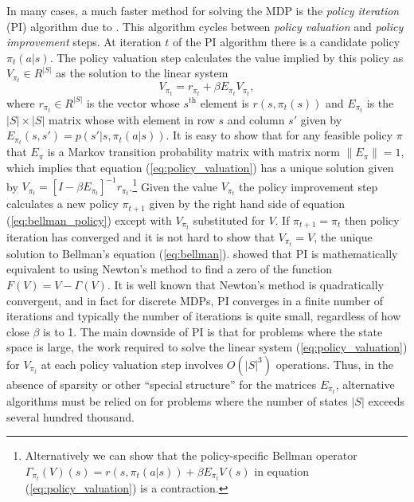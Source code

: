 In many cases, a much faster method for solving the MDP is the {\it policy iteration\/} (PI) algorithm due to \citet{Howard:1960}. This algorithm
cycles between {\it policy valuation\/} and {\it policy improvement\/} steps. At iteration $t$ of the PI algorithm there is a candidate
policy $\pi_t(a|s)$. The policy valuation step calculates the value implied by this policy as $V_{\pi_t} \in R^{|S|}$ as the solution to the linear system
\begin{equation}
     V_{\pi_t} = r_{\pi_t} + \beta E_{\pi_t} V_{\pi_t},
\label{eq:policy_valuation}
\end{equation}
where $r_{\pi_t} \in R^{|S|}$ is the vector whose $s^{\mbox{th}}$ element is $r(s,\pi_t(s))$ and $E_{\pi_t}$ is the $|S| \times |S|$ matrix whose
with element in row $s$ and column $s'$ given by $E_{\pi_t}(s,s')=p(s'|s,\pi_t(a|s))$. It is easy to show that for any feasible policy $\pi$
that $E_{\pi}$ is a Markov transition probability matrix with matrix norm $\|E_{\pi}\|=1$, which implies that equation (\ref{eq:policy_valuation})
has a unique solution given by $V_{\pi_t}=[I-\beta E_{\pi_t}]^{-1} r_{\pi_t}$.\footnote{\footnotesize Alternatively we can show that the policy-specific
Bellman operator $\Gamma_{\pi_t}(V)(s)=r(s,\pi_t(a|s))+\beta E_{\pi_t} V(s)$ in equation (\ref{eq:policy_valuation}) is a contraction.}  Given the value $V_{\pi_t}$ the  policy improvement step
calculates a new policy $\pi_{t+1}$ given by the right hand side of equation (\ref{eq:bellman_policy}) except with $V_{\pi_t}$ substituted for $V$. 
If $\pi_{t+1}=\pi_t$ then policy iteration has converged and it is not hard to show that $V_{\pi_t}=V$, the unique solution to Bellman's equation (\ref{eq:bellman}).
\citet{PutermanBrumelle:1979} showed that PI is mathematically equivalent to using Newton's method to find a zero of the function $F(V)=V-\Gamma(V)$. It  is 
well known that Newton's method is quadratically convergent, and in fact
for discrete MDPs, PI converges in a finite number of iterations and typically the
number of iterations is quite small, regardless of how close $\beta$ is to 1. The main downside of PI is that for problems where the state space
is large, the work required to solve the linear system (\ref{eq:policy_valuation}) for  $V_{\pi_t}$ at each policy valuation step involves $O(|S|^3)$ operations. 
Thus, in the absence of sparsity or other ``special structure'' for the matrices $E_{\pi_t}$,
 alternative algorithms must be relied on for problems where the number of states $|S|$ exceeds several hundred thousand.

